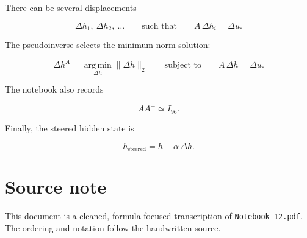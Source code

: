 \documentclass[11pt,a4paper]{article}
\begin{document}
There can be several displacements

\[
  \Delta h_1,\ \Delta h_2,\ \ldots
  \qquad\text{such that}\qquad
  A\,\Delta h_i = \Delta u.
\]

The pseudoinverse selects the minimum-norm solution:

\[
  \Delta h^{A}
  =
  \underset{\Delta h}{\operatorname{arg\,min}}
  \lVert \Delta h \rVert_2
  \qquad
  \text{subject to}
  \qquad
  A\,\Delta h = \Delta u.
\]

The notebook also records

\[
  AA^{+} \simeq I_{96}.
\]

Finally, the steered hidden state is

\[
  h_{\mathrm{steered}} = h + \alpha\,\Delta h.
\]

\section*{Source note}

This document is a cleaned, formula-focused transcription of
\texttt{Notebook 12.pdf}. The ordering and notation follow the handwritten
source.
\end{document}

